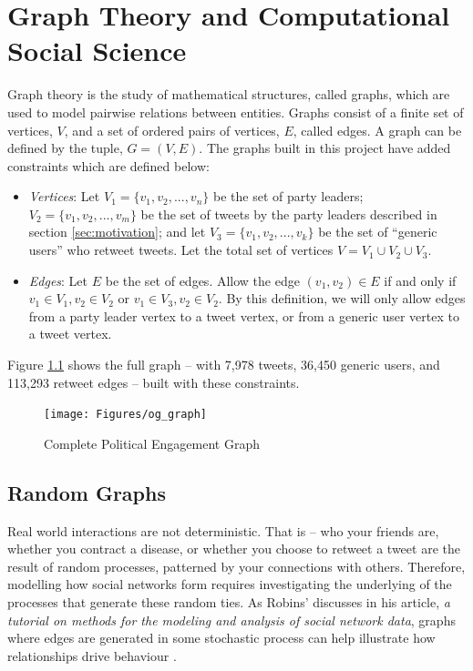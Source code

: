 \chapter{Graph Theory and Computational Social Science}\label{ch:GraphTheory}

Graph theory is the study of mathematical structures, called graphs, which are
used to model pairwise relations between entities. Graphs consist of a finite
set of vertices, $V$, and a set of ordered pairs of vertices, $E$, called edges.
A graph can be defined by the tuple, $G=(V,E)$. The graphs built in this project
have added constraints which are defined below:

\begin{itemize}
    \item \emph{Vertices}: Let $V_{1}=\{v_{1},v_{2},...,v_{n}\}$ be the set of
    party leaders; $V_{2}=\{v_{1},v_{2},...,v_{m}\}$ be the set of tweets by the
    party leaders described in section \ref{sec:motivation}; and let
    $V_{3}=\{v_{1},v_{2},...,v_{k}\}$ be the set of ``generic users'' who
    retweet tweets. Let the total set of vertices $V=V_{1}\cup V_{2}\cup V_{3}$.
    
    \item \emph{Edges}: Let $E$ be the set of edges. Allow the edge $(v_{1},
    v_{2})\in E$ if and only if $v_{1}\in V_{1}, v_{2}\in V_{2}$ or $v_{1}\in
    V_{3}, v_{2}\in V_{2}$. By this definition, we will only allow edges from a
    party leader vertex to a tweet vertex, or from a generic user vertex to a
    tweet vertex.
\end{itemize}

Figure \ref{fig:og_graph} shows the full graph -- with 7,978 tweets, 36,450
generic users, and 113,293 retweet edges --  built with these constraints.

\begin{singlespacing}
    \begin{figure}[H]
    \centering
    \texttt{[image: Figures/og\_graph]}
    \caption[Complete Political Engagement Graph]{Complete Political Engagement Graph}
    \label{fig:og_graph}
    \end{figure}
\end{singlespacing}

\section{Random Graphs}\label{sec:RandomGraphs}
    
Real world interactions are not deterministic. That is -- who your friends are,
whether you contract a disease, or whether you choose to retweet a tweet are the
result of random processes, patterned by your connections with others.
Therefore, modelling how social networks form requires investigating the
underlying of the processes that generate these random ties. As Robins'
discusses in his article,\emph{ a tutorial on methods for the modeling and
analysis of social network data}, graphs where edges are generated in some
stochastic process can help illustrate how relationships drive behaviour
\cite{robins2013tutorial}.  

